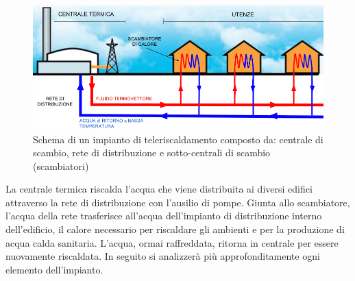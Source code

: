 \documentclass[laurea,oneside,11pt]{USiena_tesiLM}
\begin{document}
\begin{figure}[!ht]
\centering
\includegraphics[width=1.0\textwidth]{figure/schema_impianto1}
\caption{Schema di un impianto di teleriscaldamento composto da: centrale di scambio, rete di distribuzione e sotto-centrali di scambio (scambiatori)}
\label{fig:schema1}
\end{figure}

La centrale termica riscalda l'acqua che viene distribuita ai diversi edifici attraverso la rete di distribuzione con l'ausilio di pompe. Giunta allo scambiatore, l'acqua della rete trasferisce all'acqua dell'impianto di distribuzione interno dell'edificio, il calore necessario per riscaldare gli ambienti e per la produzione di acqua calda sanitaria. L'acqua, ormai raffreddata, ritorna in centrale per essere nuovamente riscaldata. 
In seguito si analizzerà più approfonditamente ogni elemento dell'impianto.
\end{document}
